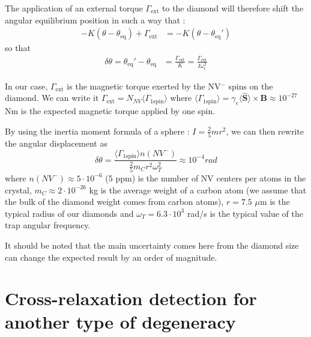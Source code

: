 \documentclass[preprintnumbers,amsmath,amssymb,onecolumn,12pt]{revtex4}
\begin{document}
The application of an external torque $\Gamma_{\mathrm{ext}}$ to the diamond will therefore shift the angular equilibrium position  in such a way that : 
\begin{align}
-K(\theta-\theta_{\mathrm{eq}}) + \Gamma_{\mathrm{ext}} &= -K(\theta-\theta_{\mathrm{eq}}') 
\end{align}
so that
\begin{align}
\delta\theta = \theta_{\mathrm{eq}}'-\theta_{\mathrm{eq}} &= \frac{\Gamma_{\mathrm{ext}}}{K}=\frac{\Gamma_{\mathrm{ext}}}{I \omega_t^2}
\end{align}

In our case, $\Gamma_{\mathrm{ext}}$ is the magnetic torque exerted by the NV$^-$ spins on the diamond. We can write it $\Gamma_{\mathrm{ext}} = N_{NV} \langle \Gamma_{\mathrm{1 spin}} \rangle$  where $\langle \Gamma_{\mathrm{1 spin}} \rangle = \gamma_e \langle\hat{\mathbf S}\rangle \times \mathbf B \approx 10^{-27}$ Nm is the expected magnetic torque applied by one spin.

By using the inertia moment formula of a sphere : $I=\frac{2}{5}m r^2$, we can then rewrite the angular displacement as $$ \delta\theta = \frac{\langle\Gamma_{\mathrm{1 spin}}\rangle n(NV^-)}{\frac{2}{5}m_Cr^2\omega_T^2} \approx 10^{-4} rad$$ where $n(NV^-) \approx 5 \cdot 10^{-6}$ (5 ppm) is the number of NV centers per atoms in the crystal, $m_C \approx 2 \cdot 10^{-26}$ kg is the average weight of a carbon atom (we assume that the bulk of the diamond weight comes from carbon atoms), $r= 7.5$ $\mu$m is the typical radius of our diamonds and $\omega_T = 6.3\cdot 10^3$ rad/s is the typical value of the trap angular frequency.

It should be noted that the main uncertainty comes here from the diamond size can change the expected result by an order of magnitude.

\section{Cross-relaxation detection for another type of degeneracy}
\end{document}
